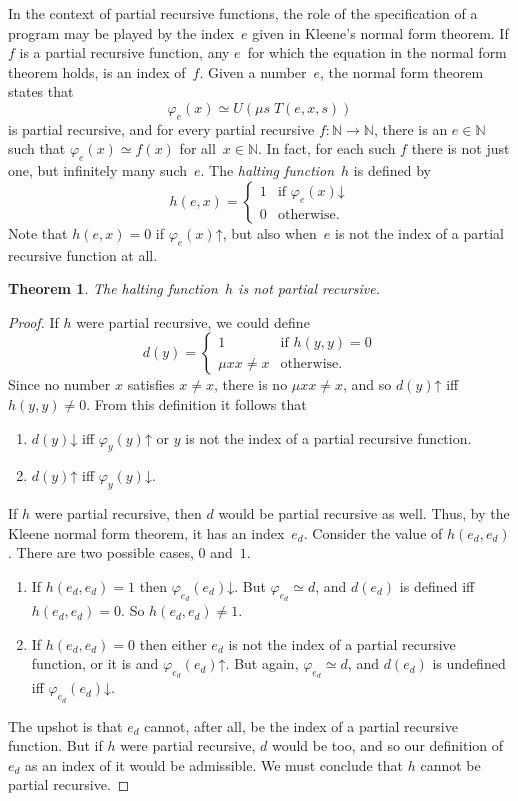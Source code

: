 \documentclass[10pt,a4paper]{article}
\theoremstyle{plain}
\newtheorem{thm}{Theorem}[section]
\theoremstyle{definition}
\theoremstyle{remark}
\newcommand*{\ollabel}[1]{\label{#1}}
\providecommand{\cfind}[1]{\varphi_{#1}}
\providecommand{\Nat}{\ensuremath{\mathbb{N}}}
\providecommand{\fdefined}{\mathord{\downarrow}}
\providecommand{\umin}{\mu}
\providecommand{\fundefined}{\mathord{\uparrow}}
\begin{document}
In the context of partial recursive functions, the role of the
specification of a program may be played by the index~$e$ given in
Kleene's normal form theorem.  If $f$ is a partial recursive function,
any $e$~for which the equation in the normal form theorem holds, is an
index of~$f$. Given a number~$e$, the normal form theorem states that
\[
\cfind{e}(x) \simeq U(\mu s \; T(e, x, s))
\]
is partial recursive, and for every partial recursive $f\colon \Nat
\to \Nat$, there is an $e \in \Nat$ such that $\cfind{e}(x) \simeq
f(x)$ for all~$x \in \Nat$.  In fact, for each such $f$ there is not
just one, but infinitely many such~$e$.  The \emph{halting function}~$h$
is defined by
\[
h(e, x) =
\begin{cases}
1 & \text{if $\cfind{e}(x) \fdefined$}\\
0 & \text{otherwise.}
\end{cases}
\]
Note that $h(e, x) = 0$ if $\cfind{e}(x) \fundefined$, but also
when~$e$ is not the index of a partial recursive function at all.

\begin{thm}
\ollabel{thm:halting-problem}
The halting function~$h$ is not partial recursive.
\end{thm}

\begin{proof}
If $h$
were partial recursive, we could define
\[
d(y) =
\begin{cases}
1 & \text{if $h(y, y) = 0$}\\
\umin{x}{x \neq x} & \text{otherwise.}
\end{cases}
\]
Since no number $x$ satisfies $x \neq x$, there is no $\umin{x}{x \neq
x}$, and so $d(y) \fundefined$ iff $h(y,y) \neq 0$. From this
definition it follows that
\begin{enumerate}
\item $d(y) \fdefined$ iff $\cfind{y}(y) \fundefined$ or $y$ is
  not the index of a partial recursive function.
\item $d(y) \fundefined$ iff $\cfind{y}(y) \fdefined$.
\end{enumerate}
If $h$ were partial recursive, then $d$ would be partial recursive as
well.  Thus, by the Kleene normal form theorem, it has an index~$e_d$.
Consider the value of $h(e_d, e_d)$. There are two possible cases, $0$
and~$1$.
\begin{enumerate}
\item If $h(e_d, e_d) = 1$ then $\cfind{e_d}(e_d) \fdefined$.  But
  $\cfind{e_d} \simeq d$, and $d(e_d)$ is defined iff $h(e_d, e_d) = 0$.
  So $h(e_d, e_d) \neq 1$.
\item If $h(e_d, e_d) = 0$ then either $e_d$ is not the index of a
  partial recursive function, or it is and $\cfind{e_d}(e_d)
  \fundefined$. But again, $\cfind{e_d} \simeq d$, and $d(e_d)$ is undefined
  iff $\cfind{e_d}(e_d) \fdefined$.
\end{enumerate}
The upshot is that $e_d$ cannot, after all, be the index of a partial
recursive function.  But if $h$ were partial recursive, $d$ would be
too, and so our definition of $e_d$ as an index of it would be
admissible.  We must conclude that $h$ cannot be partial recursive.
\end{proof}
\end{document}
